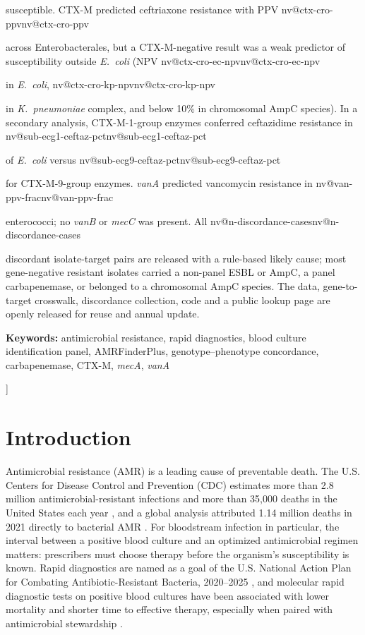 \documentclass[10pt,twocolumn,letterpaper]{article}
\makeatletter
\newcommand{\nv}[1]{\ifcsname nv@#1\endcsname\csname nv@#1\endcsname\else
  \PackageError{numbers}{Unknown number key: #1}{Run build_assets.py}\fi}
\newcommand{\g}[1]{\textit{#1}}  %
\newcommand{\eco}{\textit{E.~coli}}
\newcommand{\kpn}{\textit{K.~pneumoniae}}
\makeatother
\begin{document}
\begin{@twocolumnfalse}
\begin{minipage}{0.84\textwidth}
\begin{minipage}{0.98\textwidth}
susceptible. CTX-M predicted ceftriaxone resistance with PPV \nv{ctx-cro-ppv} across Enterobacterales, but a CTX-M-negative
result was a weak predictor of susceptibility outside \eco{} (NPV \nv{ctx-cro-ec-npv} in \eco{}, \nv{ctx-cro-kp-npv} in
\kpn{} complex, and below 10\% in chromosomal AmpC species). In a secondary analysis, CTX-M-1-group enzymes conferred
ceftazidime resistance in \nv{sub-ecg1-ceftaz-pct} of \eco{} versus \nv{sub-ecg9-ceftaz-pct} for CTX-M-9-group enzymes.
\g{vanA} predicted vancomycin resistance in \nv{van-ppv-frac} enterococci; no \g{vanB} or \g{mecC} was present.
All \nv{n-discordance-cases} discordant isolate-target pairs are released with a rule-based likely cause; most
gene-negative resistant isolates carried a non-panel ESBL or AmpC, a panel carbapenemase, or belonged to a chromosomal AmpC
species. The data, gene-to-target crosswalk, discordance collection, code and a public lookup page are openly released for
reuse and annual update.\par\vspace{4pt}\noindent
\textbf{Keywords:} antimicrobial resistance, rapid diagnostics, blood culture identification panel, AMRFinderPlus,
genotype--phenotype concordance, carbapenemase, CTX-M, \g{mecA}, \g{vanA}
\end{minipage}
\end{minipage}
\vspace{14pt}
\end{@twocolumnfalse}
]
{\renewcommand{\thefootnote}{\fnsymbol{footnote}}}

\section{Introduction}

Antimicrobial resistance (AMR) is a leading cause of preventable death. The U.S. Centers for Disease Control and
Prevention (CDC) estimates more than 2.8 million antimicrobial-resistant infections and more than 35,000 deaths in the
United States each year \cite{cdc2019}, and a global analysis attributed 1.14 million deaths in 2021 directly to bacterial
AMR \cite{gbd2024}. For bloodstream infection in particular, the interval between a positive blood culture and an
optimized antimicrobial regimen matters: prescribers must choose therapy before the organism's susceptibility is known.
Rapid diagnostics are named as a goal of the U.S. National Action Plan for Combating Antibiotic-Resistant Bacteria,
2020--2025 \cite{carb2020}, and molecular rapid diagnostic tests on positive blood cultures have been associated with lower
mortality and shorter time to effective therapy, especially when paired with antimicrobial stewardship \cite{timbrook2017,banerjee2021}.
\end{document}
